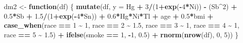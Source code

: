 \documentclass[12pt, twoside]{amherstthesis}
\newenvironment{Shaded}{\begin{snugshade}}{\end{snugshade}}
\newcommand{\AttributeTok}[1]{\textcolor[rgb]{0.13,0.29,0.53}{#1}}
\newcommand{\ControlFlowTok}[1]{\textcolor[rgb]{0.13,0.29,0.53}{\textbf{#1}}}
\newcommand{\DecValTok}[1]{\textcolor[rgb]{0.00,0.00,0.81}{#1}}
\newcommand{\FloatTok}[1]{\textcolor[rgb]{0.00,0.00,0.81}{#1}}
\newcommand{\FunctionTok}[1]{\textcolor[rgb]{0.13,0.29,0.53}{\textbf{#1}}}
\newcommand{\NormalTok}[1]{#1}
\newcommand{\OtherTok}[1]{\textcolor[rgb]{0.56,0.35,0.01}{#1}}
\newcommand{\SpecialCharTok}[1]{\textcolor[rgb]{0.81,0.36,0.00}{\textbf{#1}}}
\begin{document}
\begin{Shaded}
\begin{Highlighting}[]
\NormalTok{dm2 }\OtherTok{\textless{}{-}} \ControlFlowTok{function}\NormalTok{(df) \{}
  \FunctionTok{mutate}\NormalTok{(df, }\AttributeTok{y =} 
\NormalTok{           Hg }\SpecialCharTok{+} \DecValTok{3}\SpecialCharTok{/}\NormalTok{(}\DecValTok{1}\SpecialCharTok{+}\FunctionTok{exp}\NormalTok{(}\SpecialCharTok{{-}}\DecValTok{4}\SpecialCharTok{*}\NormalTok{Ni)) }\SpecialCharTok{{-}}\NormalTok{ (Sb}\SpecialCharTok{\^{}}\DecValTok{2}\NormalTok{) }\SpecialCharTok{+} \FloatTok{0.5}\SpecialCharTok{*}\NormalTok{Sb }\SpecialCharTok{+} \FloatTok{1.5}\SpecialCharTok{/}\NormalTok{(}\DecValTok{1}\SpecialCharTok{+}\FunctionTok{exp}\NormalTok{(}\SpecialCharTok{{-}}\DecValTok{4}\SpecialCharTok{*}\NormalTok{Sn)) }\SpecialCharTok{+} 
           \FloatTok{0.6}\SpecialCharTok{*}\NormalTok{Hg}\SpecialCharTok{*}\NormalTok{Ni}\SpecialCharTok{*}\NormalTok{Tl }\SpecialCharTok{+} 
\NormalTok{           age }\SpecialCharTok{+} \FloatTok{0.5}\SpecialCharTok{*}\NormalTok{bmi }\SpecialCharTok{+} 
           \FunctionTok{case\_when}\NormalTok{(race }\SpecialCharTok{==} \DecValTok{1} \SpecialCharTok{\textasciitilde{}} \DecValTok{1}\NormalTok{, }
\NormalTok{                     race }\SpecialCharTok{==} \DecValTok{2} \SpecialCharTok{\textasciitilde{}} \FloatTok{1.5}\NormalTok{, }
\NormalTok{                     race }\SpecialCharTok{==} \DecValTok{3} \SpecialCharTok{\textasciitilde{}} \DecValTok{1}\NormalTok{, }
\NormalTok{                     race }\SpecialCharTok{==} \DecValTok{4} \SpecialCharTok{\textasciitilde{}} \DecValTok{1}\NormalTok{, }
\NormalTok{                     race }\SpecialCharTok{==} \DecValTok{5} \SpecialCharTok{\textasciitilde{}} \FloatTok{1.5}\NormalTok{) }\SpecialCharTok{+}
           \FunctionTok{ifelse}\NormalTok{(smoke }\SpecialCharTok{==} \DecValTok{1}\NormalTok{, }\SpecialCharTok{{-}}\DecValTok{1}\NormalTok{, }\FloatTok{0.5}\NormalTok{) }\SpecialCharTok{+}
           \FunctionTok{rnorm}\NormalTok{(}\FunctionTok{nrow}\NormalTok{(df), }\DecValTok{0}\NormalTok{, }\DecValTok{5}\NormalTok{))}
\NormalTok{\}}


\end{Highlighting}
\end{Shaded}
\end{document}

